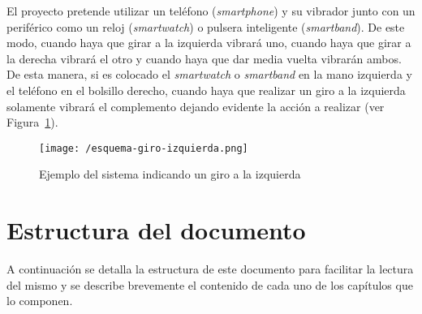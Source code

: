 El proyecto pretende utilizar un teléfono (\emph{smartphone}) y su vibrador junto con un periférico
como un reloj (\emph{smartwatch}) o pulsera inteligente (\emph{smartband}). De este modo, cuando
haya que girar a la izquierda vibrará uno, cuando haya que girar a la derecha vibrará el otro y
cuando haya que dar media vuelta vibrarán ambos. De esta manera, si es colocado el
\emph{smartwatch} o \emph{smartband} en la mano izquierda y el teléfono en el bolsillo derecho,
cuando haya que realizar un giro a la izquierda solamente vibrará el complemento dejando
evidente la acción a realizar (ver Figura~\ref{fig:giroIzquierda}).

\begin{figure}[!h]
  \begin{center}
    \texttt{[image: /esquema-giro-izquierda.png]}
    \caption{Ejemplo del sistema indicando un giro a la izquierda}
    \label{fig:giroIzquierda}
  \end{center}
\end{figure}


\section{Estructura del documento}

A continuación se detalla la estructura de este documento para facilitar la lectura del mismo y
se describe brevemente el contenido de cada uno de los capítulos que lo componen.


